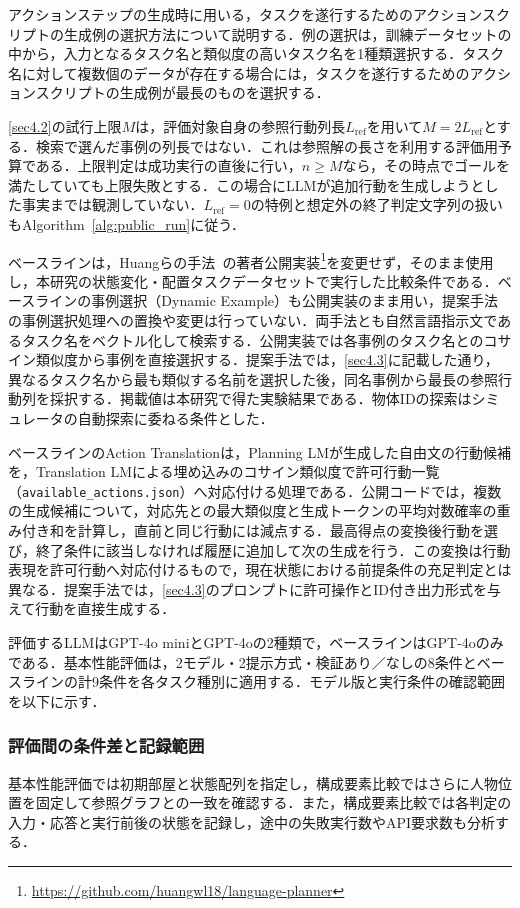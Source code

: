アクションステップの生成時に用いる，タスクを遂行するためのアクションスクリプトの生成例の選択方法について説明する．例の選択は，訓練データセットの中から，入力となるタスク名と類似度の高いタスク名を1種類選択する．タスク名に対して複数個のデータが存在する場合には，タスクを遂行するためのアクションスクリプトの生成例が最長のものを選択する．

\ref{sec4.2}の試行上限$M$は，評価対象自身の参照行動列長$L_{\mathrm{ref}}$を用いて$M=2L_{\mathrm{ref}}$とする．検索で選んだ事例の列長ではない．これは参照解の長さを利用する評価用予算である．上限判定は成功実行の直後に行い，$n\geq M$なら，その時点でゴールを満たしていても上限失敗とする．この場合にLLMが追加行動を生成しようとした事実までは観測していない．$L_{\mathrm{ref}}=0$の特例と想定外の終了判定文字列の扱いもAlgorithm~\ref{alg:public_run}に従う．

ベースラインは，Huangらの手法~\cite{huang22}の著者公開実装\footnote{\url{https://github.com/huangwl18/language-planner}}を変更せず，そのまま使用し，本研究の状態変化・配置タスクデータセットで実行した比較条件である．ベースラインの事例選択（Dynamic Example）も公開実装のまま用い，提案手法の事例選択処理への置換や変更は行っていない．両手法とも自然言語指示文であるタスク名をベクトル化して検索する．公開実装では各事例のタスク名とのコサイン類似度から事例を直接選択する．提案手法では，\ref{sec4.3}に記載した通り，異なるタスク名から最も類似する名前を選択した後，同名事例から最長の参照行動列を採択する．掲載値は本研究で得た実験結果である．物体IDの探索はシミュレータの自動探索に委ねる条件とした．

ベースラインのAction Translationは，Planning LMが生成した自由文の行動候補を，Translation LMによる埋め込みのコサイン類似度で許可行動一覧（\texttt{available\_actions.json}）へ対応付ける処理である．公開コードでは，複数の生成候補について，対応先との最大類似度と生成トークンの平均対数確率の重み付き和を計算し，直前と同じ行動には減点する．最高得点の変換後行動を選び，終了条件に該当しなければ履歴に追加して次の生成を行う．この変換は行動表現を許可行動へ対応付けるもので，現在状態における前提条件の充足判定とは異なる．提案手法では，\ref{sec4.3}のプロンプトに許可操作とID付き出力形式を与えて行動を直接生成する．

評価するLLMはGPT-4o miniとGPT-4oの2種類で，ベースラインはGPT-4oのみである．基本性能評価は，2モデル・2提示方式・検証あり／なしの8条件とベースラインの計9条件を各タスク種別に適用する．モデル版と実行条件の確認範囲を以下に示す．

\subsubsection{評価間の条件差と記録範囲}\label{sec5.provenance}
基本性能評価では初期部屋と状態配列を指定し，構成要素比較ではさらに人物位置を固定して参照グラフとの一致を確認する．また，構成要素比較では各判定の入力・応答と実行前後の状態を記録し，途中の失敗実行数やAPI要求数も分析する．

